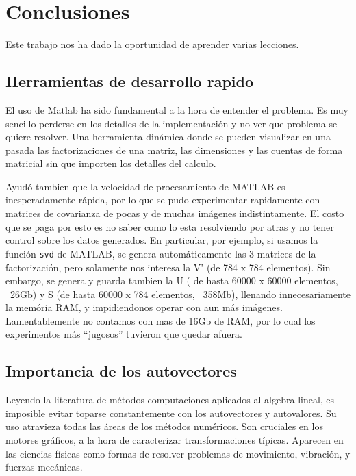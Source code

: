 \section{Conclusiones}

Este trabajo nos ha dado la oportunidad de aprender varias lecciones.

\subsection{Herramientas de desarrollo rapido}

El uso de Matlab ha sido fundamental a la hora de entender el problema.
Es muy sencillo perderse en los detalles de la implementaci\'on y no ver que
problema se quiere resolver. Una herramienta din\'amica donde se pueden visualizar
en una pasada las factorizaciones de una matriz, las dimensiones y las cuentas 
de forma matricial sin que importen los detalles del calculo.

Ayud\'o tambien que la velocidad de procesamiento de MATLAB es inesperadamente
r\'apida, por lo que se pudo experimentar rapidamente con matrices de covarianza
de pocas y de muchas im\'agenes indistintamente. El costo que se paga por esto es
no saber como lo esta resolviendo por atras y no tener control sobre los datos generados.
En particular, por ejemplo, si usamos la funci\'on \texttt{svd} de MATLAB, se genera
autom\'aticamente las 3 matrices de la factorizaci\'on, pero solamente nos interesa
la V' (de 784 x 784 elementos). Sin embargo, se genera y guarda tambien la U ( de hasta
60000 x 60000 elementos, ~26Gb) y S (de hasta 60000 x 784 elementos, ~358Mb), llenando innecesariamente
la mem\'oria RAM, y impidiendonos operar con aun m\'as im\'agenes. Lamentablemente
no contamos con mas de 16Gb de RAM, por lo cual los experimentos m\'as ``jugosos'' tuvieron que 
quedar afuera.


\subsection{Importancia de los autovectores}

Leyendo la literatura de m\'etodos computaciones aplicados al algebra lineal, es
imposible evitar toparse constantemente con los autovectores y autovalores. Su
uso atravieza todas las \'areas de los m\'etodos num\'ericos. Son cruciales
en los motores gr\'aficos, a la hora de caracterizar transformaciones t\'ipicas.
Aparecen en las ciencias f\'isicas como formas de resolver problemas de movimiento,
vibraci\'on, y fuerzas mec\'anicas.

